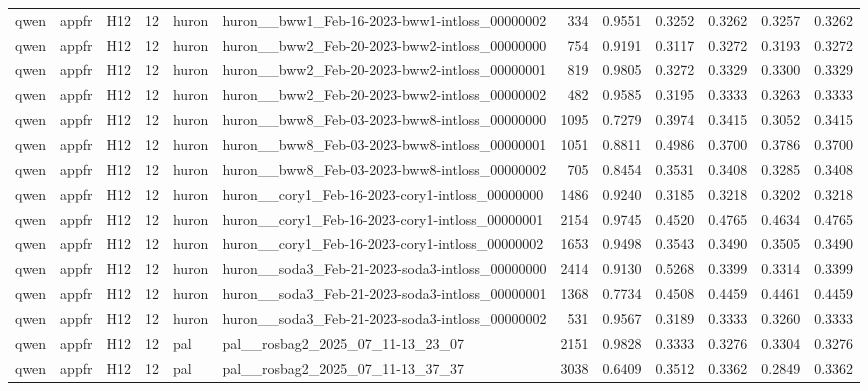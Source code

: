 \begin{table}[tbp]
\begin{tabular}{lllrllrrrrrr}
qwen & appfr & H12 & 12 & huron & huron\_\_bww1\_Feb-16-2023-bww1-intloss\_00000002 & 334 & 0.9551 & 0.3252 & 0.3262 & 0.3257 & 0.3262 \\
qwen & appfr & H12 & 12 & huron & huron\_\_bww2\_Feb-20-2023-bww2-intloss\_00000000 & 754 & 0.9191 & 0.3117 & 0.3272 & 0.3193 & 0.3272 \\
qwen & appfr & H12 & 12 & huron & huron\_\_bww2\_Feb-20-2023-bww2-intloss\_00000001 & 819 & 0.9805 & 0.3272 & 0.3329 & 0.3300 & 0.3329 \\
qwen & appfr & H12 & 12 & huron & huron\_\_bww2\_Feb-20-2023-bww2-intloss\_00000002 & 482 & 0.9585 & 0.3195 & 0.3333 & 0.3263 & 0.3333 \\
qwen & appfr & H12 & 12 & huron & huron\_\_bww8\_Feb-03-2023-bww8-intloss\_00000000 & 1095 & 0.7279 & 0.3974 & 0.3415 & 0.3052 & 0.3415 \\
qwen & appfr & H12 & 12 & huron & huron\_\_bww8\_Feb-03-2023-bww8-intloss\_00000001 & 1051 & 0.8811 & 0.4986 & 0.3700 & 0.3786 & 0.3700 \\
qwen & appfr & H12 & 12 & huron & huron\_\_bww8\_Feb-03-2023-bww8-intloss\_00000002 & 705 & 0.8454 & 0.3531 & 0.3408 & 0.3285 & 0.3408 \\
qwen & appfr & H12 & 12 & huron & huron\_\_cory1\_Feb-16-2023-cory1-intloss\_00000000 & 1486 & 0.9240 & 0.3185 & 0.3218 & 0.3202 & 0.3218 \\
qwen & appfr & H12 & 12 & huron & huron\_\_cory1\_Feb-16-2023-cory1-intloss\_00000001 & 2154 & 0.9745 & 0.4520 & 0.4765 & 0.4634 & 0.4765 \\
qwen & appfr & H12 & 12 & huron & huron\_\_cory1\_Feb-16-2023-cory1-intloss\_00000002 & 1653 & 0.9498 & 0.3543 & 0.3490 & 0.3505 & 0.3490 \\
qwen & appfr & H12 & 12 & huron & huron\_\_soda3\_Feb-21-2023-soda3-intloss\_00000000 & 2414 & 0.9130 & 0.5268 & 0.3399 & 0.3314 & 0.3399 \\
qwen & appfr & H12 & 12 & huron & huron\_\_soda3\_Feb-21-2023-soda3-intloss\_00000001 & 1368 & 0.7734 & 0.4508 & 0.4459 & 0.4461 & 0.4459 \\
qwen & appfr & H12 & 12 & huron & huron\_\_soda3\_Feb-21-2023-soda3-intloss\_00000002 & 531 & 0.9567 & 0.3189 & 0.3333 & 0.3260 & 0.3333 \\
qwen & appfr & H12 & 12 & pal & pal\_\_rosbag2\_2025\_07\_11-13\_23\_07 & 2151 & 0.9828 & 0.3333 & 0.3276 & 0.3304 & 0.3276 \\
qwen & appfr & H12 & 12 & pal & pal\_\_rosbag2\_2025\_07\_11-13\_37\_37 & 3038 & 0.6409 & 0.3512 & 0.3362 & 0.2849 & 0.3362 \\

\end{tabular}
\end{table}
